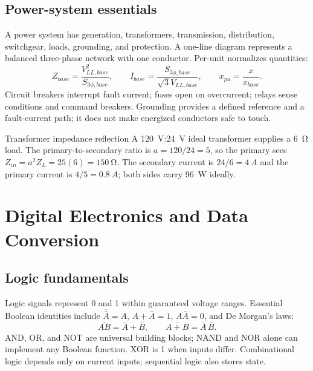 \documentclass[10pt]{article}
\begin{document}
\subsection{Power-system essentials}
A power system has generation, transformers, transmission, distribution,
switchgear, loads, grounding, and protection. A one-line diagram represents a
balanced three-phase network with one conductor. Per-unit normalizes quantities:
\begin{equation}
 Z_{base}=\frac{V_{LL,base}^2}{S_{3\phi,base}},\qquad
 I_{base}=\frac{S_{3\phi,base}}{\sqrt3V_{LL,base}},\qquad x_{pu}=\frac{x}{x_{base}}.
\end{equation}
Circuit breakers interrupt fault current; fuses open on overcurrent; relays
sense conditions and command breakers. Grounding provides a defined reference
and a fault-current path; it does not make energized conductors safe to touch.

\begin{examplebox}{Transformer impedance reflection}
A \SI{120}{V}:\SI{24}{V} ideal transformer supplies a \SI{6}{\ohm} load.
The primary-to-secondary ratio is $a=120/24=5$, so the primary sees
$Z_{in}=a^2Z_L=25(6)=\SI{150}{\ohm}$. The secondary current is
$24/6=\SI{4}{A}$ and the primary current is $4/5=\SI{0.8}{A}$; both sides
carry \SI{96}{W} ideally.
\end{examplebox}

\section{Digital Electronics and Data Conversion}

\subsection{Logic fundamentals}
Logic signals represent 0 and 1 within guaranteed voltage ranges. Essential
Boolean identities include $\overline{\overline A}=A$,
$A+\overline A=1$, $A\overline A=0$, and De Morgan's laws:
\begin{equation} \overline{AB}=\overline A+\overline B,\qquad \overline{A+B}=\overline A\,\overline B. \end{equation}
AND, OR, and NOT are universal building blocks; NAND and NOR alone can implement
any Boolean function. XOR is 1 when inputs differ. Combinational logic depends
only on current inputs; sequential logic also stores state.
\end{document}
